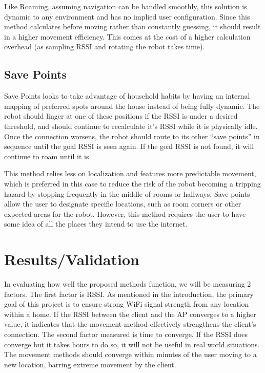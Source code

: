 Like Roaming, assuming navigation can be handled smoothly, this solution is dynamic to any environment and has no implied user configuration. Since this method calculates before moving rather than constantly guessing, it should result in a higher movement efficiency. This comes at the cost of a higher calculation overhead (as sampling RSSI and rotating the robot takes time).

\subsection{Save Points}

Save Points looks to take advantage of household habits by having an internal mapping of preferred spots around the house instead of being fully dynamic. The robot should linger at one of these positions if the RSSI is under a desired threshold, and should continue to recalculate it’s RSSI while it is physically idle. Once the connection worsens, the robot should route to its other “save points” in sequence until the goal RSSI is seen again. If the goal RSSI is not found, it will continue to roam until it is.

This method relies less on localization and features more predictable movement, which is preferred in this case to reduce the risk of the robot becoming a tripping hazard by stopping frequently in the middle of rooms or hallways. Save points allow the user to designate specific locations, such as room corners or other expected areas for the robot. However, this method requires the user to have some idea of all the places they intend to use the internet.

\section{Results/Validation}

In evaluating how well the proposed methods function, we will be measuring 2 factors. The first factor is RSSI. As mentioned in the introduction, the primary goal of this project is to ensure strong WiFi signal strength from any location within a home. If the RSSI between the client and the AP converges to a higher value, it indicates that the movement method effectively strengthens the client’s connection. The second factor measured is time to converge. If the RSSI does converge but it takes hours to do so, it will not be useful in real world situations. The movement methods should converge within minutes of the user moving to a new location, barring extreme movement by the client.

